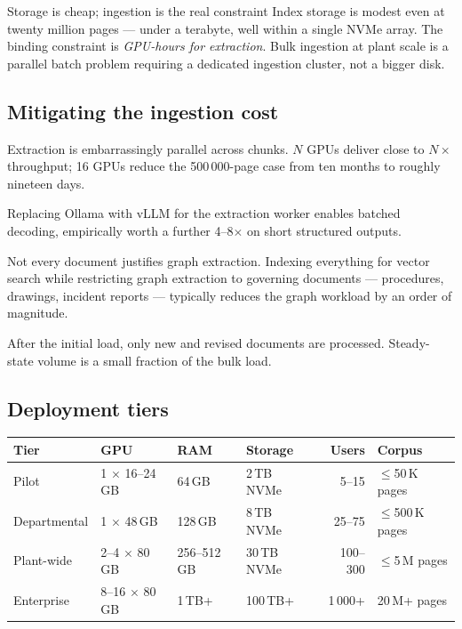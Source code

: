 \begin{keybox}{Storage is cheap; ingestion is the real constraint}
Index storage is modest even at twenty million pages --- under a terabyte, well
within a single NVMe array. The binding constraint is \emph{GPU-hours for
extraction}. Bulk ingestion at plant scale is a parallel batch problem
requiring a dedicated ingestion cluster, not a bigger disk.
\end{keybox}

\subsection{Mitigating the ingestion cost}

\begin{description}[leftmargin=0pt,style=nextline]
\item[Parallelism.] Extraction is embarrassingly parallel across chunks.
$N$ GPUs deliver close to $N\times$ throughput; 16 GPUs reduce the 500\,000-page
case from ten months to roughly nineteen days.
\item[Continuous batching.] Replacing Ollama with vLLM for the extraction
worker enables batched decoding, empirically worth a further 4--8$\times$ on
short structured outputs.
\item[Tiered extraction.] Not every document justifies graph extraction.
Indexing everything for vector search while restricting graph extraction to
governing documents --- procedures, drawings, incident reports --- typically
reduces the graph workload by an order of magnitude.
\item[Incremental ingestion.] After the initial load, only new and revised
documents are processed. Steady-state volume is a small fraction of the bulk
load.
\end{description}

\subsection{Deployment tiers}

\begin{center}
\small
\renewcommand{\arraystretch}{1.3}
\begin{tabularx}{\linewidth}{@{}l l l l r X@{}}
\toprule
\textbf{Tier} & \textbf{GPU} & \textbf{RAM} & \textbf{Storage} & \textbf{Users} & \textbf{Corpus} \\
\midrule
Pilot & 1 $\times$ 16--24\,GB & 64\,GB & 2\,TB NVMe & 5--15 & $\le$50\,K pages \\
Departmental & 1 $\times$ 48\,GB & 128\,GB & 8\,TB NVMe & 25--75 & $\le$500\,K pages \\
Plant-wide & 2--4 $\times$ 80\,GB & 256--512\,GB & 30\,TB NVMe & 100--300 & $\le$5\,M pages \\
Enterprise & 8--16 $\times$ 80\,GB & 1\,TB+ & 100\,TB+ & 1\,000+ & 20\,M+ pages \\
\bottomrule
\end{tabularx}
\end{center}

